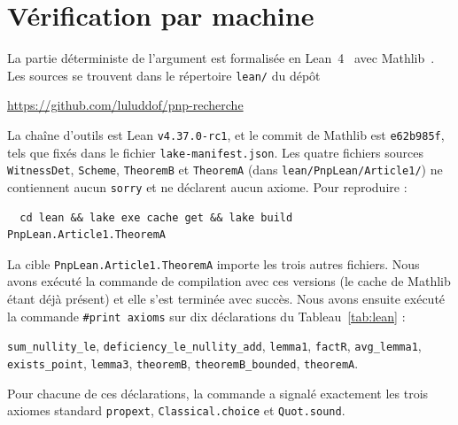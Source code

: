 \documentclass[11pt,a4paper]{article}
\theoremstyle{definition}
\theoremstyle{remark}
\begin{document}
\section{Vérification par machine}\label{sec:lean}

La partie déterministe de l'argument est formalisée en Lean~4~\cite{Lean4} avec
Mathlib~\cite{Mathlib}. Les sources se trouvent dans le répertoire \texttt{lean/} du dépôt
\begin{center}
\url{https://github.com/luluddof/pnp-recherche}
\end{center}
La chaîne d'outils est Lean \texttt{v4.37.0-rc1}, et le commit de Mathlib est
\texttt{e62b985f}, tels que fixés dans le fichier \texttt{lake-manifest.json}. Les quatre
fichiers sources \texttt{WitnessDet}, \texttt{Scheme}, \texttt{TheoremB} et
\texttt{TheoremA} (dans \texttt{lean/PnpLean/Article1/}) ne contiennent aucun \texttt{sorry} et ne
déclarent aucun axiome. Pour reproduire :
\begin{verbatim}
  cd lean && lake exe cache get && lake build PnpLean.Article1.TheoremA
\end{verbatim}
La cible \texttt{PnpLean.Article1.TheoremA} importe les trois autres fichiers. Nous avons exécuté la
commande de compilation avec ces versions (le cache de Mathlib étant déjà présent) et elle
s'est terminée avec succès. Nous avons ensuite exécuté la commande \texttt{\#print axioms}
sur dix déclarations du Tableau~\ref{tab:lean} :
\begin{center}
\texttt{sum\_nullity\_le}, \texttt{deficiency\_le\_nullity\_add}, \texttt{lemma1},
\texttt{factR}, \texttt{avg\_lemma1},\\ \texttt{exists\_point}, \texttt{lemma3},
\texttt{theoremB}, \texttt{theoremB\_bounded}, \texttt{theoremA}.
\end{center}
Pour chacune de ces déclarations, la commande a signalé exactement les trois axiomes
standard \texttt{propext}, \texttt{Classical.choice} et \texttt{Quot.sound}.
\end{document}
